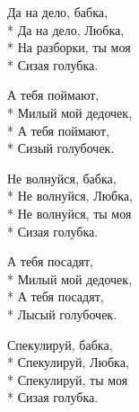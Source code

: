 \medskip

\begin{minipage}{\linewidth}
\hspace*{1.5em}Да на дело, бабка,\\*
\hspace*{1.5em}Да на дело, Любка,\\*
\hspace*{1.5em}На разборки, ты моя\\*
\hspace*{1.5em}Сизая голубка.\\
\end{minipage}\par\medskip\nobreak

\medskip

\begin{minipage}{\linewidth}
А тебя поймают,\\*
Милый мой дедочек,\\*
А тебя поймают,\\*
Сизый голубочек.\\
\end{minipage}\par\medskip\nobreak

\medskip

\begin{minipage}{\linewidth}
\hspace*{1.5em}Не волнуйся, бабка,\\*
\hspace*{1.5em}Не волнуйся, Любка,\\*
\hspace*{1.5em}Не волнуйся, ты моя\\*
\hspace*{1.5em}Сизая голубка.\\
\end{minipage}\par\medskip\nobreak

\medskip

\begin{minipage}{\linewidth}
А тебя посадят,\\*
Милый мой дедочек,\\*
А тебя посадят,\\*
Лысый голубочек.\\
\end{minipage}\par\medskip\nobreak

\medskip

\begin{minipage}{\linewidth}
\hspace*{1.5em}Спекулируй, бабка,\\*
\hspace*{1.5em}Спекулируй, Любка,\\*
\hspace*{1.5em}Спекулируй, ты моя\\*
\hspace*{1.5em}Сизая голубка.\\
\end{minipage}\par\medskip\nobreak

